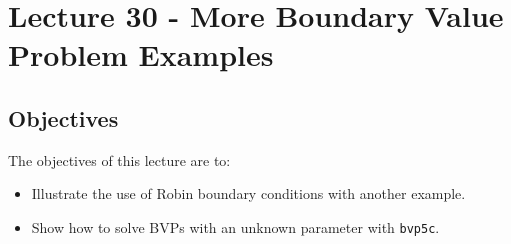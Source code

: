 \chapter{Lecture 30 - More Boundary Value Problem Examples}
\label{ch:lec30n}
\section{Objectives}
The objectives of this lecture are to:
\begin{itemize}
\item Illustrate the use of Robin boundary conditions with another example.
\item Show how to solve BVPs with an unknown parameter with \lstinline[style=myMatlab]{bvp5c}.
\end{itemize}
\setcounter{lstannotation}{0}
